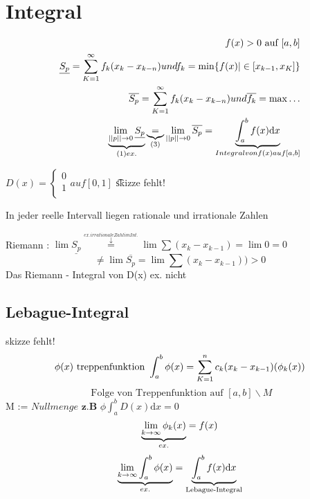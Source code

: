 \section{Integral}
\begin{align*}
f(x)>0 \text{ auf } [a,b]\\
\underline{S_p}= \sum_{K=1}^{\infty} f_k (x_k - x_{k-n})und f_k =\min \{ f(x) | \in [x_{k-1},x_K ] \} \\
\overline{S_p}= \sum_{K=1}^{\infty} f_k (x_k - x_{k-n})und \overline{f_k} =\max \dots \\
\underbrace{ \lim\limits_{||p|| \rightarrow 0} \underline{S_p}}_{(1) ex.}\underbrace{=}_{(3)} \lim\limits_{||p|| \rightarrow 0 } \overline{S_p}= \underbrace{\int_a^b f(x) \mathrm{d}x}_{Integral von f(x) auf [a,b]}
\end{align*}
\begin{example}
$ 	D(x)=\begin{cases} 
		0  \\    
		1 \\  
	\end{cases} auf[0,1]$
	 \t{skizze fehlt!}
\end{example}
\begin{remark}
In jeder reelle Intervall liegen rationale und irrationale Zahlen
\end{remark}
Riemann : $\lim \underline{S_p} \overset{\overset{ex. irrationale Zahl im Int.}{\downarrow}}{=} \lim \sum (x_k- x_{k-1}) 
= \lim 0 = 0 $ 
\[  \neq \lim \overline{S_p}= \lim \sum (x_k-x_{k-1}))> 0\]
Das Riemann - Integral von D(x) ex. nicht 

\subsection{Lebague-Integral }
 skizze fehlt!\\
\[ \phi(x) \text{ treppenfunktion } \int_a^b \phi(x) = \sum_{K=1}^{n} c_k (x_k - x_{k-1} ) 
(\phi_k (x)) \]
\[ \text{ Folge von Treppenfunktion auf } [a,b] \backslash M \]
M := $ Nullmenge \textbf{ z.B } \phi \int_a^b D(x)\mathrm{d}x=0$ \\
\[\underbrace{\lim\limits_{k \rightarrow \infty} \phi_k (x)}_{ex.}= f(x)\]
\[\underbrace{\lim\limits_{k \rightarrow \infty} \int_a^b \phi(x)  }_{ex.}=\underbrace{\int_a^b f(x) \mathrm{d}x }_{\text{Lebague-Integral}} \]
